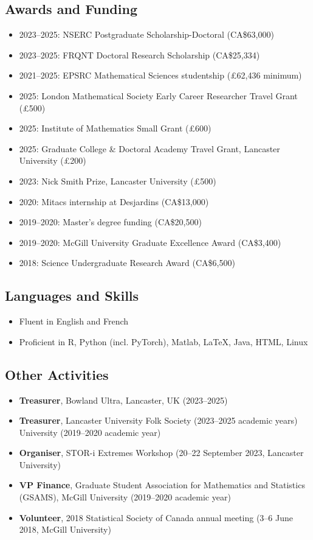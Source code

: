 \documentclass[11pt]{scrartcl}
\newcommand{\cvsection}[1]{\subsection*{#1}}
\begin{document}
\cvsection{Awards and Funding}
\begin{itemize}[leftmargin=*,nosep]
    \item 2023--2025: NSERC Postgraduate Scholarship-Doctoral (CA\$63,000)
    \item 2023--2025: FRQNT Doctoral Research Scholarship (CA\$25,334)
    \item 2021--2025: EPSRC Mathematical Sciences studentship (£62,436 minimum)
    \item 2025: London Mathematical Society Early Career Researcher Travel Grant (£500)
    \item 2025: Institute of Mathematics Small Grant (£600)
    \item 2025: Graduate College \& Doctoral Academy Travel Grant, Lancaster University (£200)
    \item 2023: Nick Smith Prize, Lancaster University (£500)
    \item 2020: Mitacs internship at Desjardins (CA\$13,000)
    \item 2019--2020: Master's degree funding (CA\$20,500)
    \item 2019--2020: McGill University Graduate Excellence Award (CA\$3,400)
    \item 2018: Science Undergraduate Research Award (CA\$6,500)
\end{itemize}

\cvsection{Languages and Skills}
\begin{itemize}[leftmargin=*,nosep]
    \item Fluent in English and French
    \item Proficient in R, Python (incl. PyTorch), Matlab, \LaTeX, Java, HTML, Linux
\end{itemize}

\cvsection{Other Activities}
\begin{itemize}[leftmargin=*,nosep]
    \item \textbf{Treasurer}, Bowland Ultra, Lancaster, UK (2023--2025)
    \item \textbf{Treasurer}, Lancaster University Folk Society (2023--2025 academic years)
University (2019--2020 academic year)
    \item \textbf{Organiser}, STOR-i Extremes Workshop (20--22 September 2023, Lancaster University)
    \item \textbf{VP Finance}, Graduate Student Association for Mathematics and Statistics (GSAMS), McGill University (2019--2020 academic year)
    \item \textbf{Volunteer}, 2018 Statistical Society of Canada annual meeting (3--6 June 2018, McGill University)
\end{itemize}
\end{document}
